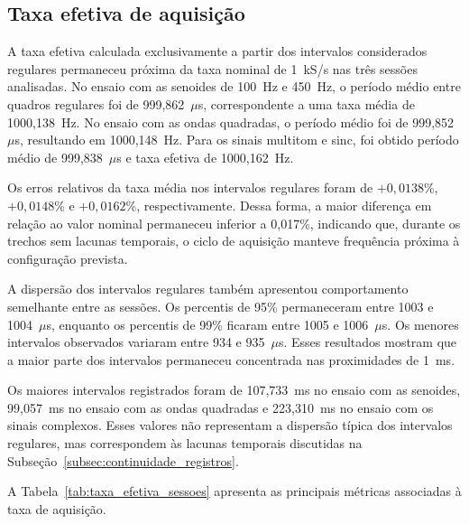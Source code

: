 \documentclass[a4paper,12pt]{fcte}
\begin{document}
\subsection{Taxa efetiva de aquisição}
\label{subsec:taxa_efetiva}

A taxa efetiva calculada exclusivamente a partir dos intervalos considerados regulares permaneceu próxima da taxa nominal de 1~kS/s nas três sessões analisadas. No ensaio com as senoides de 100~Hz e 450~Hz, o período médio entre quadros regulares foi de 999,862~$\mu$s, correspondente a uma taxa média de 1000,138~Hz. No ensaio com as ondas quadradas, o período médio foi de 999,852~$\mu$s, resultando em 1000,148~Hz. Para os sinais multitom e sinc, foi obtido período médio de 999,838~$\mu$s e taxa efetiva de 1000,162~Hz.

Os erros relativos da taxa média nos intervalos regulares foram de $+0,0138$\%, $+0,0148$\% e $+0,0162$\%, respectivamente. Dessa forma, a maior diferença em relação ao valor nominal permaneceu inferior a 0,017\%, indicando que, durante os trechos sem lacunas temporais, o ciclo de aquisição manteve frequência próxima à configuração prevista.

A dispersão dos intervalos regulares também apresentou comportamento semelhante entre as sessões. Os percentis de 95\% permaneceram entre 1003 e 1004~$\mu$s, enquanto os percentis de 99\% ficaram entre 1005 e 1006~$\mu$s. Os menores intervalos observados variaram entre 934 e 935~$\mu$s. Esses resultados mostram que a maior parte dos intervalos permaneceu concentrada nas proximidades de 1~ms.

Os maiores intervalos registrados foram de 107,733~ms no ensaio com as senoides, 99,057~ms no ensaio com as ondas quadradas e 223,310~ms no ensaio com os sinais complexos. Esses valores não representam a dispersão típica dos intervalos regulares, mas correspondem às lacunas temporais discutidas na Subseção~\ref{subsec:continuidade_registros}.

A Tabela~\ref{tab:taxa_efetiva_sessoes} apresenta as principais métricas associadas à taxa de aquisição.
\end{document}
